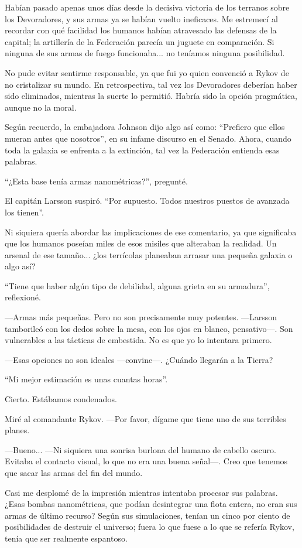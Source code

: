 Habían pasado apenas unos días desde la decisiva victoria de los terranos sobre los Devoradores, y sus armas ya se habían vuelto ineficaces. Me estremecí al recordar con qué facilidad los humanos habían atravesado las defensas de la capital; la artillería de la Federación parecía un juguete en comparación. Si ninguna de sus armas de fuego funcionaba... no teníamos ninguna posibilidad.

No pude evitar sentirme responsable, ya que fui yo quien convenció a Rykov de no cristalizar su mundo. En retrospectiva, tal vez los Devoradores deberían haber sido eliminados, mientras la suerte lo permitió. Habría sido la opción pragmática, aunque no la moral.

Según recuerdo, la embajadora Johnson dijo algo así como: ``Prefiero que ellos mueran antes que nosotros'', en su infame discurso en el Senado. Ahora, cuando toda la galaxia se enfrenta a la extinción, tal vez la Federación entienda esas palabras.

``¿Esta base tenía armas nanométricas?'', pregunté.

El capitán Larsson suspiró. ``Por supuesto. Todos nuestros puestos de avanzada los tienen''.

Ni siquiera quería abordar las implicaciones de ese comentario, ya que significaba que los humanos poseían miles de esos misiles que alteraban la realidad. Un arsenal de ese tamaño... ¿los terrícolas planeaban arrasar una pequeña galaxia o algo así?

``Tiene que haber algún tipo de debilidad, alguna grieta en su armadura'', reflexioné.

—Armas más pequeñas. Pero no son precisamente muy potentes. —Larsson tamborileó con los dedos sobre la mesa, con los ojos en blanco, pensativo—. Son vulnerables a las tácticas de embestida. No es que yo lo intentara primero.

—Esas opciones no son ideales —convine—. ¿Cuándo llegarán a la Tierra?

``Mi mejor estimación es unas cuantas horas''.

Cierto. Estábamos condenados.

Miré al comandante Rykov. —Por favor, dígame que tiene uno de sus terribles planes.

—Bueno... —Ni siquiera una sonrisa burlona del humano de cabello oscuro. Evitaba el contacto visual, lo que no era una buena señal—. Creo que tenemos que sacar las armas del fin del mundo.

Casi me desplomé de la impresión mientras intentaba procesar sus palabras. ¿Esas bombas nanométricas, que podían desintegrar una flota entera, no eran sus armas de último recurso? Según sus simulaciones, tenían un cinco por ciento de posibilidades de destruir el universo; fuera lo que fuese a lo que se refería Rykov, tenía que ser realmente espantoso.

